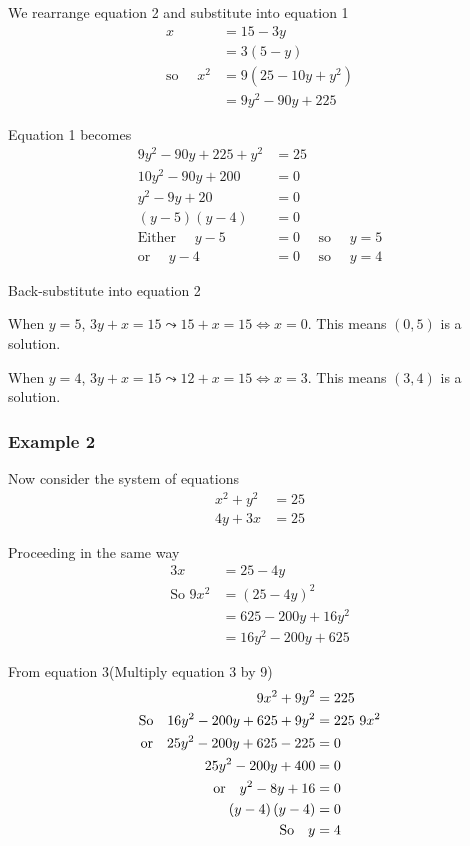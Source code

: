 We rearrange equation 2 and substitute into equation 1
\begin{align*}x &  =  15 -3 y \\
	&  =  3 \left (5 -y\right ) \\
	\text{so }\quad x^{2} &  =  9 \left (25 -10 y +y^{2}\right ) \\
	&  =  9 y^{2} -90 y +225\end{align*}

Equation 1 becomes
\begin{align*}9 y^{2} -90 y +225 +y^{2} &  =  25 \\
	10 y^{2} -90 y +200 &  =  0 \\
	y^{2} -9 y +20 &  = 0 \\
	\left (y -5\right ) \left (y -4\right ) &  =  0 \\
	\text{Either }\quad y -5 &  =  0\quad\text{ so }\quad y =5 \\
	\text{or }\quad y -4 &  =  0\quad\text{ so }\quad y =4\end{align*}

Back-substitute into equation 2 

When $y =5$, $3 y +x =15 \leadsto 15 +x =15 \Longleftrightarrow x =0$. This means $\left (0 ,5\right )$ is a solution. 

When $y =4$, $3 y +x =15 \leadsto 12 +x =15 \Longleftrightarrow x =3$. This means $\left (3 ,4\right )$ is a solution. 

\subsubsection{Example 2}
Now consider the system of equations
\begin{align}x^{2} +y^{2} &  =  25 \tag{3} \\
4 y +3 x &  =  25 \tag{4}\end{align}

Proceeding in the same way
\begin{align*}3 x &  =  25 -4 y \\
	\text{So\ \ \ }9 x^{2} &  =  \left (25 -4 y\right )^{2} \\
	&  =  625 -200 y +16 y^{2} \\
	&  =  16 y^{2} -200 y +625\end{align*}

From equation 3\qquad (Multiply equation 3 by 9)
\begin{align*}9 x^{2} +9 y^{2} &  =  225 \\
	\text{So}\quad 16 y^{2} -200 y +625 +9 y^{2} &  = 225\text{\ }{\tiny 9}{\tiny x}^{{\small 2}}\text{} \\
	\text{or}\quad 25 y^{2} -200 y +625 -225 &  =  0 \\
	25 y^{2} -200 y +400 &  =  0\text{\ \ } \\
	\text{or} \quad y^{2} -8 y +16 &  = 0 \\
	\left (y -4\right ) \left (y -4\right ) &  = 0 \\
	\text{So}\quad y &  =  4\end{align*}


